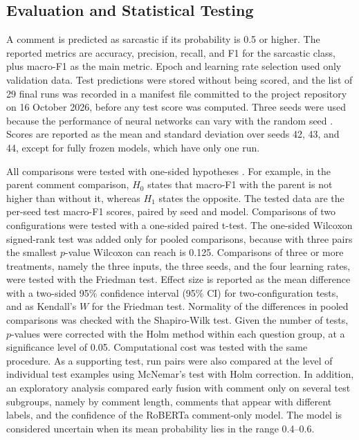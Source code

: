 \documentclass[conference]{IEEEtran}
\begin{document}
\subsection{Evaluation and Statistical Testing}
\label{sec:eval}
A comment is predicted as sarcastic if its probability is 0.5 or higher. The reported metrics are accuracy, precision, recall, and F1 for the sarcastic class, plus macro-F1 as the main metric. Epoch and learning rate selection used only validation data. Test predictions were stored without being scored, and the list of 29 final runs was recorded in a manifest file committed to the project repository on 16 October 2026, before any test score was computed. Three seeds were used because the performance of neural networks can vary with the random seed \cite{ulmer2022deep}. Scores are reported as the mean and standard deviation over seeds 42, 43, and 44, except for fully frozen models, which have only one run.

All comparisons were tested with one-sided hypotheses \cite{dror2020significance}. For example, in the parent comment comparison, $H_0$ states that macro-F1 with the parent is not higher than without it, whereas $H_1$ states the opposite. The tested data are the per-seed test macro-F1 scores, paired by seed and model. Comparisons of two configurations were tested with a one-sided paired t-test. The one-sided Wilcoxon signed-rank test was added only for pooled comparisons, because with three pairs the smallest $p$-value Wilcoxon can reach is 0.125. Comparisons of three or more treatments, namely the three inputs, the three seeds, and the four learning rates, were tested with the Friedman test. Effect size is reported as the mean difference with a two-sided 95\% confidence interval (95\% CI) for two-configuration tests, and as Kendall's $W$ for the Friedman test. Normality of the differences in pooled comparisons was checked with the Shapiro-Wilk test. Given the number of tests, $p$-values were corrected with the Holm method within each question group, at a significance level of 0.05. Computational cost was tested with the same procedure. As a supporting test, run pairs were also compared at the level of individual test examples using McNemar's test with Holm correction. In addition, an exploratory analysis compared early fusion with comment only on several test subgroups, namely by comment length, comments that appear with different labels, and the confidence of the RoBERTa comment-only model. The model is considered uncertain when its mean probability lies in the range 0.4--0.6.
\end{document}
